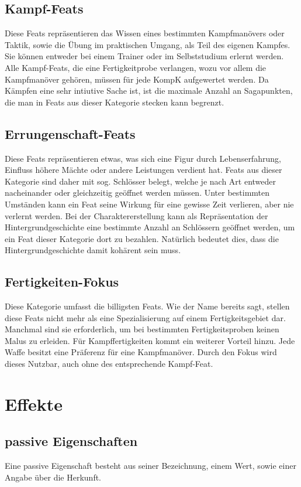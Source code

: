 \documentclass[a4paper,12pt,oneside]{book}
\begin{document}
\section{Kampf-Feats}
Diese Feats repräsentieren das Wissen eines bestimmten Kampfmanövers oder Taktik, sowie die Übung im praktischen Umgang, als Teil des eigenen Kampfes. Sie können entweder bei einem Trainer oder im Selbststudium erlernt werden. Alle Kampf-Feats, die eine Fertigkeitprobe verlangen, wozu vor allem die Kampfmanöver gehören, müssen für jede KompK aufgewertet werden. Da Kämpfen eine sehr intiutive Sache ist, ist die maximale Anzahl an Sagapunkten, die man in Feats aus dieser Kategorie stecken kann begrenzt.

\section{Errungenschaft-Feats}
Diese Feats repräsentieren etwas, was sich eine Figur durch Lebenserfahrung, Einfluss höhere Mächte oder andere Leistungen verdient hat. Feats aus dieser Kategorie sind daher mit sog. Schlösser belegt, welche je nach Art entweder nacheinander oder gleichzeitig geöffnet werden müssen. Unter bestimmten Umständen kann ein Feat seine Wirkung für eine gewisse Zeit verlieren, aber nie verlernt werden. Bei der Charaktererstellung kann als Repräsentation der Hintergrundgeschichte eine bestimmte Anzahl an Schlössern geöffnet werden, um ein Feat dieser Kategorie dort zu bezahlen. Natürlich bedeutet dies, dass die Hintergrundgeschichte damit kohärent sein muss.

\section{Fertigkeiten-Fokus}
Diese Kategorie umfasst die billigsten Feats. Wie der Name bereits sagt, stellen diese Feats nicht mehr als eine Spezialisierung auf einem Fertigkeitsgebiet dar. Manchmal sind sie erforderlich, um bei bestimmten Fertigkeitsproben keinen Malus zu erleiden. Für Kampffertigkeiten kommt ein weiterer Vorteil hinzu. Jede Waffe besitzt eine Präferenz für eine Kampfmanöver. Durch den Fokus wird dieses Nutzbar, auch ohne des entsprechende Kampf-Feat.

\chapter{Effekte}
\section{passive Eigenschaften}
Eine passive Eigenschaft besteht aus seiner Bezeichnung, einem Wert, sowie einer Angabe über die Herkunft.
\end{document}
